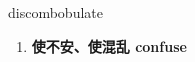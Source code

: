 
\begin{frame}
{\huge discombobulate}
\begin{center}
\begin{enumerate}\Large
  \item \textbf{使不安、使混乱 confuse}
\end{enumerate}
\end{center}
\end{frame}
